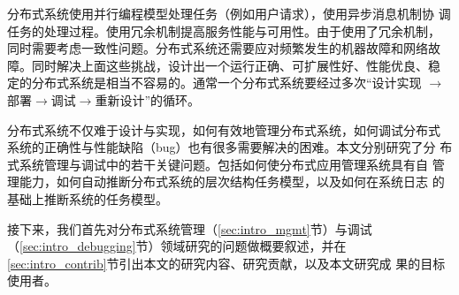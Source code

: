 分布式系统使用并行编程模型处理任务（例如用户请求），使用异步消息机制协
调任务的处理过程。使用冗余机制提高服务性能与可用性。由于使用了冗余机制，
同时需要考虑一致性问题。分布式系统还需要应对频繁发生的机器故障和网络故
障。同时解决上面这些挑战，设计出一个运行正确、可扩展性好、性能优良、稳
定的分布式系统是相当不容易的。通常一个分布式系统要经过多次“设计实现
$\to$部署$\to$调试$\to$重新设计”的循环。

分布式系统不仅难于设计与实现，如何有效地管理分布式系统，如何调试分布式
系统的正确性与性能缺陷（bug）也有很多需要解决的困难。本文分别研究了分
布式系统管理与调试中的若干关键问题。包括如何使分布式应用管理系统具有自
管理能力，如何自动推断分布式系统的层次结构任务模型，以及如何在系统日志
的基础上推断系统的任务模型。

接下来，我们首先对分布式系统管理（\ref{sec:intro_mgmt}节）与调试
（\ref{sec:intro_debugging}节）领域研究的问题做概要叙述，并在~
\ref{sec:intro_contrib}节引出本文的研究内容、研究贡献，以及本文研究成
果的目标使用者。

% 
% 
% 
% 






% 
% 
% 
% 
% 

